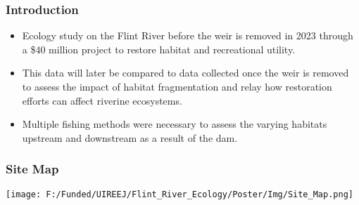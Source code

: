 \documentclass[10pt]{beamer}
\newcommand{\iast}{\item[$\circledast$]}
\begin{document}


\begin{frame}
    \frametitle{Introduction} %
    \begin{itemize}
        \iast Ecology study on the Flint River before the weir is removed in 2023 through a \$40 million project to restore habitat and recreational utility. \vspace{2.5mm} %
        \iast This data will later be compared to data collected once the weir is removed to assess the impact of habitat fragmentation and relay how restoration efforts can affect riverine ecosystems. \vspace{2.5mm} %
        \iast Multiple fishing methods were necessary to assess the varying habitats upstream and downstream as a result of the dam.
    \end{itemize}
\end{frame}



\begin{frame}
    \frametitle{Site Map} %
    \centering
    \texttt{[image: F:/Funded/UIREEJ/Flint\_River\_Ecology/Poster/Img/Site\_Map.png]} \\
\end{frame}

\end{document}
